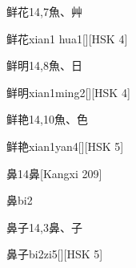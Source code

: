 \begin{Entry}{鲜花}{14,7}{⿂、⾋}
  \begin{Phonetics}{鲜花}{xian1 hua1}[][HSK 4]
  \end{Phonetics}
\end{Entry}

\begin{Entry}{鲜明}{14,8}{⿂、⽇}
  \begin{Phonetics}{鲜明}{xian1ming2}[][HSK 4]
  \end{Phonetics}
\end{Entry}

\begin{Entry}{鲜艳}{14,10}{⿂、⾊}
  \begin{Phonetics}{鲜艳}{xian1yan4}[][HSK 5]
  \end{Phonetics}
\end{Entry}

\begin{Entry}{鼻}{14}{⿐}[Kangxi 209]
  \begin{Phonetics}{鼻}{bi2}
  \end{Phonetics}
\end{Entry}

\begin{Entry}{鼻子}{14,3}{⿐、⼦}
  \begin{Phonetics}{鼻子}{bi2zi5}[][HSK 5]
  \end{Phonetics}
\end{Entry}


